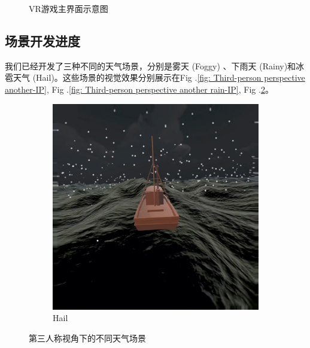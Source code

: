 \documentclass[a4paper,10pt]{article}
\begin{document}
\begin{figure}[htbp]
			\captionsetup{font=scriptsize}
			\caption{
				\label{fig: Main menu}	
				VR游戏主界面示意图				
			}
		\end{figure}
	
		\subsection{场景开发进度}
		
		我们已经开发了三种不同的天气场景，分别是雾天 (Foggy) 、下雨天 (Rainy)和冰雹天气 (Hail)。这些场景的视觉效果分别展示在Fig .\ref{fig: Third-person perspective another-IP}, Fig .\ref{fig: Third-person perspective another rain-IP}, Fig .\ref{fig: Third-person perspective another hail-IP}。
		
		\begin{figure}[htbp] 
			\centering 
			
			
			\begin{subfigure}{0.3\textwidth}
				\includegraphics[width=\linewidth]{picture/Third-person perspective another hail-IP}
				\captionsetup{font=scriptsize}
				\caption{Hail}
				\label{fig: Third-person perspective another hail-IP}	
			\end{subfigure}
			\captionsetup{font=scriptsize}
			\caption{
				\label{fig: Scene}	
				第三人称视角下的不同天气场景					
			}
		\end{figure}
	
\end{document}
